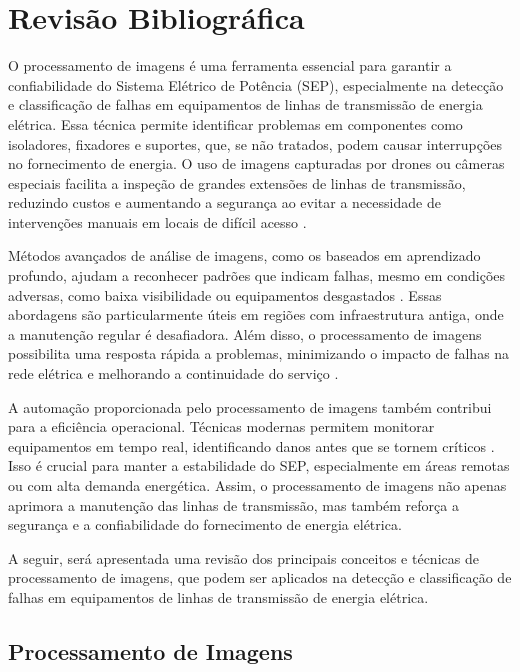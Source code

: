 \chapter{Revisão Bibliográfica}

O processamento de imagens é uma ferramenta essencial para garantir a confiabilidade do Sistema Elétrico de Potência (SEP), especialmente na detecção e classificação de falhas em equipamentos de linhas de transmissão de energia elétrica. Essa técnica permite identificar problemas em componentes como isoladores, fixadores e suportes, que, se não tratados, podem causar interrupções no fornecimento de energia. O uso de imagens capturadas por drones ou câmeras especiais facilita a inspeção de grandes extensões de linhas de transmissão, reduzindo custos e aumentando a segurança ao evitar a necessidade de intervenções manuais em locais de difícil acesso \cite{eze2022deep}.

Métodos avançados de análise de imagens, como os baseados em aprendizado profundo, ajudam a reconhecer padrões que indicam falhas, mesmo em condições adversas, como baixa visibilidade ou equipamentos desgastados \cite{Altaie2023}. Essas abordagens são particularmente úteis em regiões com infraestrutura antiga, onde a manutenção regular é desafiadora. Além disso, o processamento de imagens possibilita uma resposta rápida a problemas, minimizando o impacto de falhas na rede elétrica e melhorando a continuidade do serviço \cite{kumar2023novel}.

A automação proporcionada pelo processamento de imagens também contribui para a eficiência operacional. Técnicas modernas permitem monitorar equipamentos em tempo real, identificando danos antes que se tornem críticos \cite{eze2022deep}. Isso é crucial para manter a estabilidade do SEP, especialmente em áreas remotas ou com alta demanda energética. Assim, o processamento de imagens não apenas aprimora a manutenção das linhas de transmissão, mas também reforça a segurança e a confiabilidade do fornecimento de energia elétrica.

A seguir, será apresentada uma revisão dos principais conceitos e técnicas de processamento de imagens, que podem ser aplicados na detecção e classificação de falhas em equipamentos de linhas de transmissão de energia elétrica.

\section{Processamento de Imagens}

